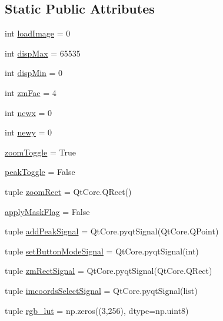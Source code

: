 \subsection*{Static Public Attributes}
\begin{DoxyCompactItemize}
\item 
int \hyperlink{classmy_zm_display_1_1my_zm_display_a04859be3d64685448954dba22cdf78a4}{load\-Image} = 0
\item 
int \hyperlink{classmy_zm_display_1_1my_zm_display_a713e9fc2c8bf740fab1eb2e748b21f91}{disp\-Max} = 65535
\item 
int \hyperlink{classmy_zm_display_1_1my_zm_display_ab548c51111f007ef31a97994e8b410d8}{disp\-Min} = 0
\item 
int \hyperlink{classmy_zm_display_1_1my_zm_display_a70fe9d6a18cd3a6149fb5198448793c1}{zm\-Fac} = 4
\item 
int \hyperlink{classmy_zm_display_1_1my_zm_display_a88f396278207e78ff8c5e27dd6749b4c}{newx} = 0
\item 
int \hyperlink{classmy_zm_display_1_1my_zm_display_a0770201bb3e33e877d381cae65d6cfd9}{newy} = 0
\item 
\hyperlink{classmy_zm_display_1_1my_zm_display_a946f14d48450a167199b9ac2e14af7a4}{zoom\-Toggle} = True
\item 
\hyperlink{classmy_zm_display_1_1my_zm_display_a9b9dd02bf8545bd50e1d2f49a4be9ae3}{peak\-Toggle} = False
\item 
tuple \hyperlink{classmy_zm_display_1_1my_zm_display_a1caafb5ed9bfd30d1e992c754389a331}{zoom\-Rect} = Qt\-Core.\-Q\-Rect()
\item 
\hyperlink{classmy_zm_display_1_1my_zm_display_a5baf38a6e9c6609307240a3c4be0bca7}{apply\-Mask\-Flag} = False
\item 
tuple \hyperlink{classmy_zm_display_1_1my_zm_display_a7dbe912029d1343f3839c19050e235e3}{add\-Peak\-Signal} = Qt\-Core.\-pyqt\-Signal(Qt\-Core.\-Q\-Point)
\item 
tuple \hyperlink{classmy_zm_display_1_1my_zm_display_aa0ea7f897243bc2529551255f512d8c3}{set\-Button\-Mode\-Signal} = Qt\-Core.\-pyqt\-Signal(int)
\item 
tuple \hyperlink{classmy_zm_display_1_1my_zm_display_a24271d6d079df901d5128772fea0400b}{zm\-Rect\-Signal} = Qt\-Core.\-pyqt\-Signal(Qt\-Core.\-Q\-Rect)
\item 
tuple \hyperlink{classmy_zm_display_1_1my_zm_display_a47a941c14bc12031105afe99e85ef371}{imcoords\-Select\-Signal} = Qt\-Core.\-pyqt\-Signal(list)
\item 
tuple \hyperlink{classmy_zm_display_1_1my_zm_display_a6fd2b18cb86a3acb62e794079a9af2ca}{rgb\-\_\-lut} = np.\-zeros((3,256), dtype=np.\-uint8)
\end{DoxyCompactItemize}


